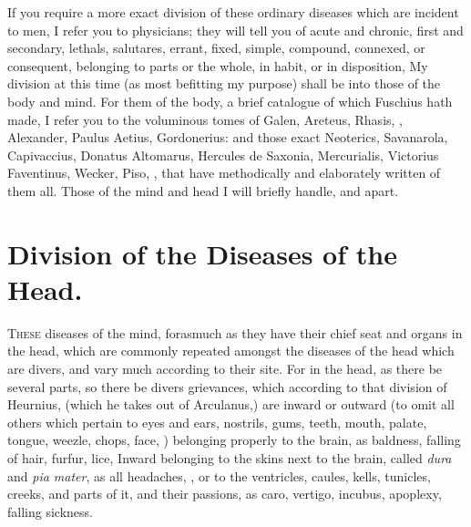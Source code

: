 If you require a more exact division of these ordinary diseases which are
incident to men, I refer you to physicians; they will tell
you of acute and chronic, first and secondary, lethals, salutares, errant,
fixed, simple, compound, connexed, or consequent, belonging to parts or the
whole, in habit, or in disposition, \etc{} My division at this time (as most
befitting my purpose) shall be into those of the body and mind. For them of the
body, a brief catalogue of which Fuschius hath made,
 I refer you to the
voluminous tomes of Galen, Areteus, Rhasis, \Avicenna{}, Alexander, Paulus Aetius,
Gordonerius: and those exact Neoterics, Savanarola, Capivaccius, Donatus
Altomarus, Hercules de Saxonia, Mercurialis, Victorius Faventinus, Wecker,
Piso, \etc{}, that have methodically and elaborately written of them all. Those
of the mind and head I will briefly handle, and apart.

\section{Division of the Diseases of the Head.}


\lettrine{T}{hese} diseases of the mind, forasmuch as they have their chief seat and organs
in the head, which are commonly repeated amongst the diseases of the head which
are divers, and vary much according to their site. For in the head, as there be
several parts, so there be divers grievances, which according to that division
of Heurnius, (which he takes out of Arculanus,) are inward
or outward (to omit all others which pertain to eyes and ears, nostrils, gums,
teeth, mouth, palate, tongue, weezle, chops, face, \etc{}) belonging properly
to the brain, as baldness, falling of hair, furfur, lice, \etc{}
Inward belonging to the skins next to the brain, called
\emph{dura} and \emph{pia mater}, as all headaches, \etc{}, or to the
ventricles, caules, kells, tunicles, creeks, and parts of it, and their
passions, as caro, vertigo, incubus, apoplexy, falling sickness.

